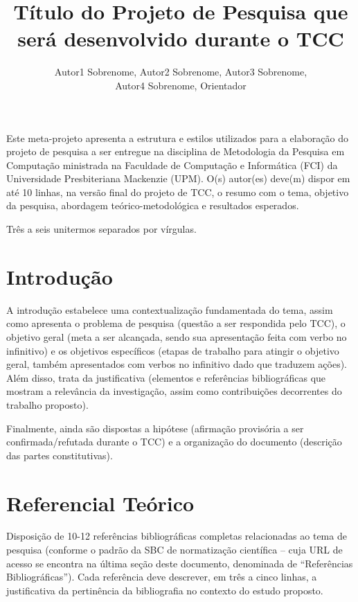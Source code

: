 \documentclass[12pt]{article}
\title{Título do Projeto de Pesquisa que será desenvolvido durante o TCC}
\author{Autor1 Sobrenome\inst{1}, Autor2 Sobrenome\inst{1}, Autor3 Sobrenome\inst{1}, \\Autor4 Sobrenome\inst{1}, Orientador\inst{1,2}}
\begin{document}
 

\maketitle
     
\begin{resumo} 
  Este meta-projeto apresenta a estrutura e estilos utilizados para a elaboração do projeto de pesquisa a ser entregue na disciplina de Metodologia da Pesquisa em Computação ministrada na Faculdade de Computação e Informática (FCI) da Universidade Presbiteriana Mackenzie (UPM). O(s) autor(es) deve(m) dispor em até 10 linhas, na versão final do projeto de TCC, o resumo com o tema, objetivo da pesquisa, abordagem teórico-metodológica e resultados esperados.
\end{resumo}
\begin{palavraschave}
  Três a seis unitermos separados por vírgulas.  
\end{palavraschave}

\section{Introdução}

A introdução estabelece uma contextualização fundamentada do tema, assim como apresenta o problema de pesquisa (questão a ser respondida pelo TCC), o objetivo geral (meta a ser alcançada, sendo sua apresentação feita com verbo no infinitivo) e os objetivos específicos (etapas de trabalho para atingir o objetivo geral, também apresentados com verbos no infinitivo dado que traduzem ações). Além disso, trata da justificativa (elementos e referências bibliográficas que mostram a relevância da investigação, assim como contribuições decorrentes do trabalho proposto).

Finalmente, ainda são dispostas a hipótese (afirmação provisória a ser confirmada/refutada durante o TCC) e a organização do documento (descrição das partes constitutivas).

\section{Referencial Teórico}
Disposição de 10-12 referências bibliográficas completas relacionadas ao tema de pesquisa (conforme o padrão da SBC de normatização científica – cuja URL de acesso se encontra na última seção deste documento, denominada de “Referências Bibliográficas”). Cada referência deve descrever, em três a cinco linhas, a justificativa da pertinência da bibliografia no contexto do estudo proposto.
\end{document}
